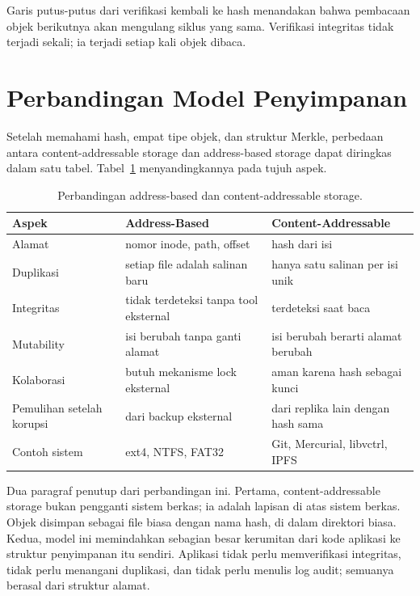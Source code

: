 \documentclass[11pt,a4paper]{article}
\begin{document}
Garis putus-putus dari verifikasi kembali ke hash menandakan bahwa pembacaan objek berikutnya akan mengulang siklus yang sama. Verifikasi integritas tidak terjadi sekali; ia terjadi setiap kali objek dibaca.

\section{Perbandingan Model Penyimpanan}

Setelah memahami hash, empat tipe objek, dan struktur Merkle, perbedaan antara content-addressable storage dan address-based storage dapat diringkas dalam satu tabel. Tabel~\ref{tab:storage-comparison} menyandingkannya pada tujuh aspek.

\begin{table}[H]
	\centering
	\caption{Perbandingan address-based dan content-addressable storage.}
	\label{tab:storage-comparison}
	\footnotesize
	\begin{tabularx}{\textwidth}{l X X}
		\toprule
		Aspek                     & Address-Based                         & Content-Addressable                \\
		\midrule
		Alamat                    & nomor inode, path, offset             & hash dari isi                      \\
		Duplikasi                 & setiap file adalah salinan baru       & hanya satu salinan per isi unik    \\
		Integritas                & tidak terdeteksi tanpa tool eksternal & terdeteksi saat baca               \\
		Mutability                & isi berubah tanpa ganti alamat        & isi berubah berarti alamat berubah \\
		Kolaborasi                & butuh mekanisme lock eksternal        & aman karena hash sebagai kunci     \\
		Pemulihan setelah korupsi & dari backup eksternal                 & dari replika lain dengan hash sama \\
		Contoh sistem             & ext4, NTFS, FAT32                     & Git, Mercurial, libvctrl, IPFS     \\
		\bottomrule
	\end{tabularx}
\end{table}

Dua paragraf penutup dari perbandingan ini. Pertama, content-addressable storage bukan pengganti sistem berkas; ia adalah lapisan di atas sistem berkas. Objek disimpan sebagai file biasa dengan nama hash, di dalam direktori biasa. Kedua, model ini memindahkan sebagian besar kerumitan dari kode aplikasi ke struktur penyimpanan itu sendiri. Aplikasi tidak perlu memverifikasi integritas, tidak perlu menangani duplikasi, dan tidak perlu menulis log audit; semuanya berasal dari struktur alamat.
\end{document}
